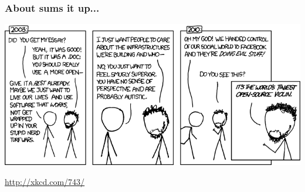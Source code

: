\documentclass{beamer}
\begin{document}


    


\begin{frame}
  \frametitle{About sums it up...}
  \begin{center}\includegraphics[width=1\textwidth]{../img/violin}\end{center}
  \begin{footnotesize}
    \textcolor{beamer@myblue}{\href{http://xkcd.com/743/}{http://xkcd.com/743/}}
  \end{footnotesize}
\end{frame}
\end{document}
